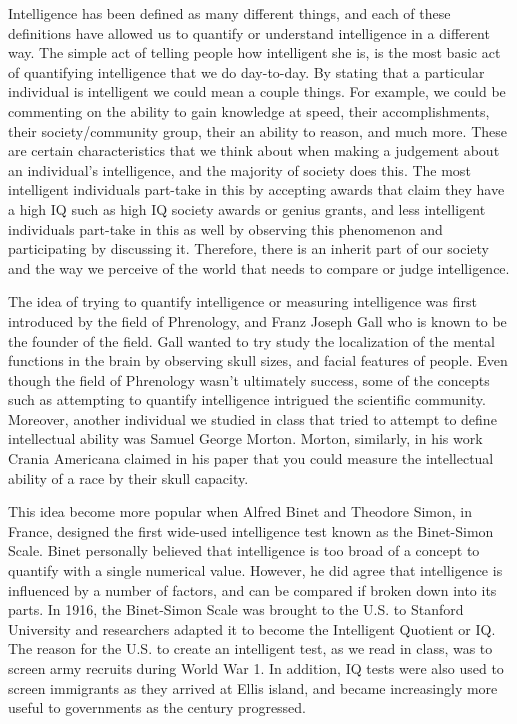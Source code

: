 \documentclass[11pt, oneside]{article}
\begin{document}
\par Intelligence has been defined as many different things, and each of these definitions have allowed us to quantify or understand intelligence in a different way. The simple act of telling people how intelligent she is, is the most basic act of quantifying intelligence that we do day-to-day. By stating that a particular individual is intelligent we could mean a couple things. For example, we could be commenting on the ability to gain knowledge at speed, their accomplishments, their society/community group, their an ability to reason, and much more. 
These are certain characteristics that we think about when making a judgement about an individual's intelligence, and the majority of society does this. The most intelligent individuals part-take in this by accepting awards that claim they have a high IQ such as high IQ society awards or genius grants, and less intelligent individuals part-take in this as well by observing this phenomenon and participating by discussing it. Therefore, there is an inherit part of our society and the way we perceive of the world that needs to compare or judge intelligence.
\par The idea of trying to quantify intelligence or measuring intelligence was first introduced by the field of Phrenology, and Franz Joseph Gall who is known to be the founder of the field. Gall wanted to try study the localization of the mental functions in the brain by observing skull sizes, and facial features of people. Even though the field of Phrenology wasn't ultimately success, some of the concepts such as attempting to quantify intelligence intrigued the scientific community. Moreover, another individual we studied in class that tried to attempt to define intellectual ability was Samuel George Morton. Morton, similarly, in his work Crania Americana claimed in his paper that you could measure the intellectual ability of a race by their skull capacity. 

\par This idea become more popular when Alfred Binet and Theodore Simon, in France, designed the first wide-used intelligence test known as the Binet-Simon Scale. Binet personally believed that intelligence is too broad of a concept to quantify with a single numerical value. However, he did agree that intelligence is influenced by a number of factors, and can be compared if broken down into its parts. In 1916, the Binet-Simon Scale was brought to the U.S. to Stanford University and researchers adapted it to become the Intelligent Quotient or IQ. The reason for the U.S. to create an intelligent test, as we read in class, was to screen army recruits during World War 1. In addition, IQ tests were also used to screen immigrants as they arrived at Ellis island, and became increasingly more useful to governments as the century progressed. 
\end{document}
